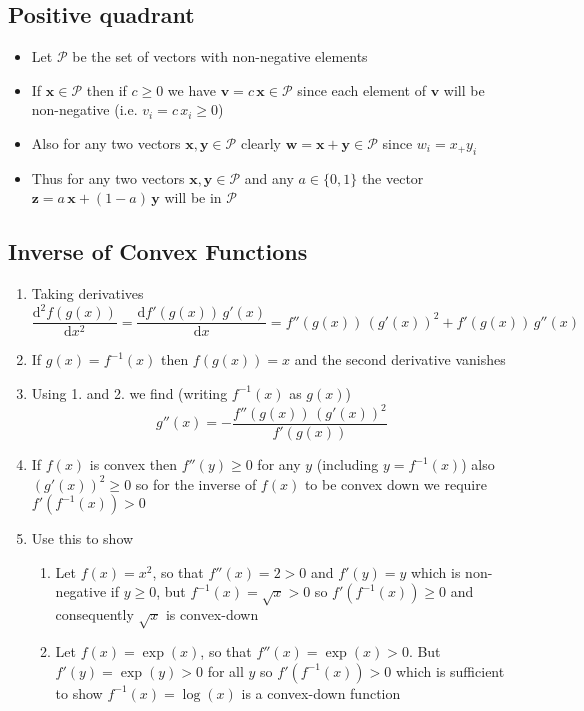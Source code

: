 \documentclass[11pt]{article}
\newcommand{\dd}{\mathrm{d}}
\begin{document}
\subsection{Positive quadrant}
\label{sec:org8728ec0}
\begin{itemize}
\item Let \(\mathcal{P}\) be the set of vectors with non-negative elements
\item If \(\bm{x}\in\mathcal{P}\) then if \(c\geq0\) we have
\(\bm{v} = c\,\bm{x}\in\mathcal{P}\) since each element of \(\bm{v}\) will
be non-negative (i.e. \(v_i=c\,x_i\geq0\))
\item Also for any two vectors \(\bm{x},\bm{y}\in\mathcal{P}\) clearly
\(\bm{w} = \bm{x} + \bm{y} \in \mathcal{P}\) since \(w_i=x_+y_i\)
\item Thus for any two vectors  \(\bm{x},\bm{y}\in\mathcal{P}\) and any
\(a\in\{0,1\}\) the vector \(\bm{z} = a\,\bm{x} +(1-a)\,\bm{y}\) will
be in \(\mathcal{P}\)
\end{itemize}

\subsection{Inverse of Convex Functions}
\label{sec:org0df6b63}
\begin{enumerate}
\item Taking derivatives
$$ \frac{\dd^2 f(g(x))}{\dd x^2} = \frac{\dd
      f'(g(x))\,g'(x)}{\dd x} = f''(g(x))\, (g'(x))^2 + f'(g(x))\,
      g''(x) $$
\item If \(g(x) = f^{-1}(x)\) then \(f(g(x))=x\) and the second derivative vanishes
\item Using 1. and 2. we find (writing \(f^{-1}(x)\) as \(g(x)\))
$$ g''(x) = - \frac{f''(g(x))\, (g'(x))^2}{f'(g(x))} $$
\item If \(f(x)\) is convex then \(f''(y)\geq0\) for any \(y\) (including
\(y=f^{-1}(x)\)) also \((g'(x))^2\geq0\) so for the inverse of
\(f(x)\) to be convex down we require \(f'(f^{-1}(x))>0\)
\item Use this to show
\begin{enumerate}
\item Let \(f(x)=x^2\), so that \(f''(x)=2>0\) and \(f'(y)=y\) which is
non-negative if \(y\geq0\), but \(f^{-1}(x)=\sqrt{x}>0\) so
\(f'(f^{-1}(x))\geq0\) and consequently \(\sqrt{x}\) is
convex-down
\item Let \(f(x)=\exp(x)\), so that \(f''(x) = \exp(x) >0\).  But
\(f'(y) = \exp(y)>0\) for all \(y\) so \(f'(f^{-1}(x))>0\) which is
sufficient to show \(f^{-1}(x)=\log(x)\) is a convex-down
function
\end{enumerate}
\end{enumerate}
\end{document}
